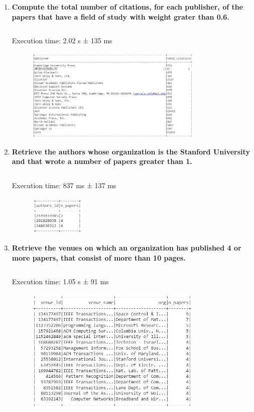 \documentclass{Configuration_Files/PoliMi3i_thesis}
\begin{document}
\begin{enumerate}
   \item \textbf{Compute the total number of citations, for each publisher,  of the papers that have a field of study with weight grater than 0.6.}
    \inputminted[linenos,tabsize=2,breaklines]{Python}{code/queries_spark/query_8.txt}
    Execution time: 2.02 s ± 135 ms
    \begin{figure}[H]
        \centering
         \includegraphics[width=0.8\textwidth]{Images/queries_spark/query_8.jpg}
    \end{figure} 
    
    \item \textbf{Retrieve the authors whose organization is the Stanford University and that wrote a number of papers greater than 1.}
    \inputminted[linenos,tabsize=2,breaklines]{Python}{code/queries_spark/query_9.txt}
    Execution time: 837 ms ± 137 ms
    \begin{figure}[H]
        \centering
         \includegraphics[width=0.25\textwidth]{Images/queries_spark/query_9.jpg}
    \end{figure}  
    
    \item \textbf{Retrieve the venues on which an organization has published 4 or more papers, that consist of more than 10 pages.}
    \inputminted[linenos,tabsize=2,breaklines]{Python}{code/queries_spark/query_10.txt}
    Execution time: 1.05 s ± 91 ms
    \begin{figure}[H]
        \centering
         \includegraphics[width=0.8\textwidth]{Images/queries_spark/query_10.jpg}
    \end{figure}
\end{enumerate}
\end{document}
